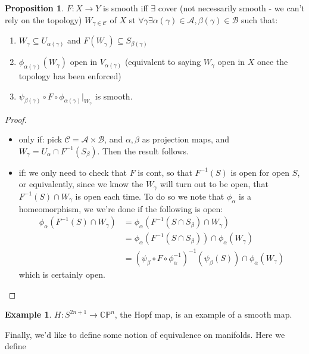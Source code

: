 \documentclass{article}
\theoremstyle{definition}
\newtheorem{proposition}{Proposition}
\newtheorem{example}{Example}
\begin{document}
\begin{proposition}
$F: X \to Y$ is smooth iff $\exists$ cover (not necessarily smooth - we
  can't rely on the topology) $W_{\gamma \in \mathcal{C}}$ of $X$ st $\forall
  \gamma \exists \alpha(\gamma) \in \mathcal{A}, \beta(\gamma) \in \mathcal{B}$
  such that:
\begin{enumerate}
  \item $W_\gamma \subseteq U_{\alpha(\gamma)}$ and $F(W_\gamma) \subseteq
    S_{\beta(\gamma)}$
  \item $\phi_{\alpha(\gamma)}(W_\gamma)$ open in $V_{\alpha(\gamma)}$
    (equivalent to saying $W_\gamma$ open in $X$ once the topology has been
    enforced)
  \item $\psi_{\beta(\gamma)} \circ F \circ \phi_{\alpha(\gamma)} |_{W_\gamma}$
    is smooth.
  \end{enumerate}
\end{proposition}
\begin{proof}
\begin{itemize}
\item only if: pick $\mathcal{C} = \mathcal{A} \times \mathcal{B}$, and
  $\alpha, \beta$ as projection maps, and $W_\gamma = U_{\alpha} \cap
  F^{-1}(S_\beta )$. Then the result follows.
\item if: we only need to check that $F$ is cont, so that $F^{-1}(S)$ is open
  for open $S$, or equivalently, since we know the $W_\gamma$ will turn out to
  be open, that $F^{-1}(S) \cap W_\gamma$ is open each time. To do so we note
  that $\phi_\alpha$ is a homeomorphism, we we're done if the following is open:
  \begin{align*}
    \phi_\alpha(F^{-1}(S) \cap W_\gamma)
    &= \phi_\alpha(F^{-1}(S \cap S_\beta) \cap W_\gamma) \\
    &= \phi_\alpha(F^{-1}(S \cap S_\beta)) \cap \phi_\alpha(W_\gamma) \\
    &= (\psi_\beta \circ F \circ \phi_\alpha^{-1})^{-1} (\psi_\beta(S)) \cap \phi_\alpha(W_\gamma)
  \end{align*}
  which is certainly open.
\end{itemize}
\end{proof}

\begin{example}
  $H : S^{2n + 1} \to \mathbb{CP}^n$, the Hopf map, is an example of a smooth
  map.
\end{example}

Finally, we'd like to define some notion of equivalence on manifolds. Here we
define
\end{document}
